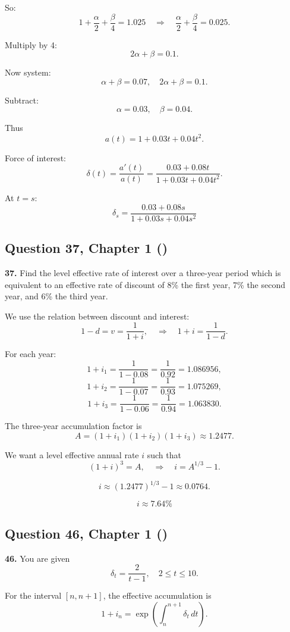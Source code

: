 \documentclass[12pt, a4paper]{article}
\begin{document}
So:
\[
1 + \frac{\alpha}{2} + \frac{\beta}{4} = 1.025 
\quad \Rightarrow \quad \frac{\alpha}{2} + \frac{\beta}{4} = 0.025.
\]

Multiply by 4:
\[
2\alpha + \beta = 0.1.
\]

Now system:
\[
\alpha + \beta = 0.07, \quad 2\alpha + \beta = 0.1.
\]

Subtract:
\[
\alpha = 0.03, \quad \beta = 0.04.
\]

Thus
\[
a(t) = 1 + 0.03t + 0.04t^2.
\]

Force of interest:
\[
\delta(t) = \frac{a'(t)}{a(t)} 
= \frac{0.03 + 0.08t}{1+0.03t+0.04t^2}.
\]

At \(t=s\):
\[
\boxed{\delta_s = \frac{0.03 + 0.08s}{1+0.03s+0.04s^2}}
\]


\subsection*{Question 37, Chapter 1  (\cite{toi3rd})}

\textbf{37.} Find the level effective rate of interest over a three-year period 
which is equivalent to an effective rate of discount of 8\% the first year, 
7\% the second year, and 6\% the third year.

\bigskip
We use the relation between discount and interest:
\[
1-d = v = \frac{1}{1+i}, 
\quad \Rightarrow \quad 1+i = \frac{1}{1-d}.
\]

For each year:
\[
1+i_1 = \frac{1}{1-0.08} = \frac{1}{0.92} = 1.086956,
\]
\[
1+i_2 = \frac{1}{1-0.07} = \frac{1}{0.93} = 1.075269,
\]
\[
1+i_3 = \frac{1}{1-0.06} = \frac{1}{0.94} = 1.063830.
\]

The three-year accumulation factor is
\[
A = (1+i_1)(1+i_2)(1+i_3) \approx 1.2477.
\]

We want a level effective annual rate \(i\) such that
\[
(1+i)^3 = A,
\quad \Rightarrow \quad i = A^{1/3} - 1.
\]

\[
i \approx (1.2477)^{1/3} - 1 \approx 0.0764.
\]

\[
\boxed{i \approx 7.64\%}
\]

\subsection*{Question 46, Chapter 1  (\cite{toi3rd})}    

\textbf{46.} You are given 
\[
\delta_t = \frac{2}{t-1}, \quad 2 \leq t \leq 10.
\]

For the interval \([n, n+1]\), the effective accumulation is
\[
1+i_n = \exp\!\left(\int_n^{n+1} \delta_t \, dt\right).
\]
\end{document}
